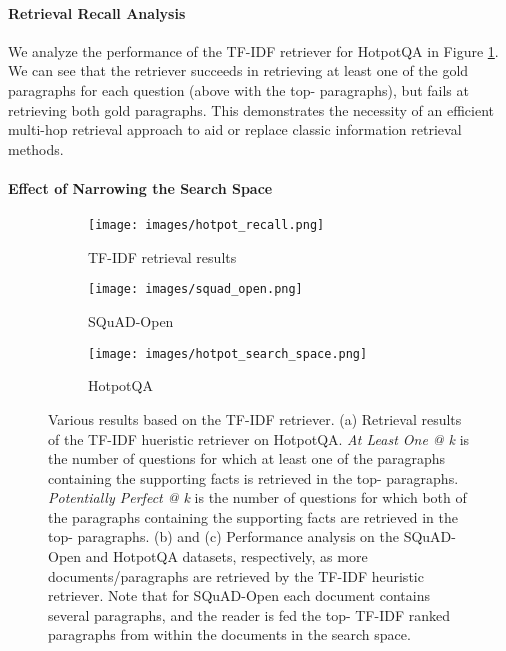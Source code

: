 \documentclass[11pt,a4paper,dvipsnames]{article}
\begin{document}
\paragraph{Retrieval Recall Analysis}



We analyze the performance of the TF-IDF retriever for HotpotQA in Figure \ref{fig:tfidf}. We can see that the retriever succeeds in retrieving at least one of the gold paragraphs for each question (above  with the top- paragraphs), but fails at retrieving both gold paragraphs. This demonstrates the necessity of an efficient multi-hop retrieval approach to aid or replace classic information retrieval methods. 


\paragraph{Effect of Narrowing the Search Space}

\begin{figure*}[!ht]
\centering
\begin{subfigure}{0.3\linewidth}
\centering
\texttt{[image: images/hotpot\_recall.png]}
\caption{TF-IDF retrieval results}
\label{fig:tfidf}
\end{subfigure}
\begin{subfigure}{0.3\linewidth}
\centering
\texttt{[image: images/squad\_open.png]}
\caption{SQuAD-Open}
\label{fig:squad_search_space}
\end{subfigure}
\begin{subfigure}{0.3\linewidth}
\centering
\texttt{[image: images/hotpot\_search\_space.png]}
\caption{HotpotQA}
\label{fig:hotpot_search_space}
\end{subfigure}
\caption{Various results based on the TF-IDF retriever. (a) Retrieval results of the TF-IDF hueristic retriever on HotpotQA. \textit{At Least One @ k} is the number of questions for which at least one of the paragraphs containing the supporting facts is retrieved in the top- paragraphs. \textit{Potentially Perfect @ k} is the number of questions for which both of the paragraphs containing the supporting facts are retrieved in the top- paragraphs.
(b) and (c)
Performance analysis on the SQuAD-Open and HotpotQA datasets, respectively, as more documents/paragraphs are retrieved by the TF-IDF heuristic retriever. Note that for SQuAD-Open each document contains several paragraphs, and the reader is fed the top- TF-IDF ranked paragraphs from within the documents in the search space.}
\label{fig:all_plots}
\end{figure*}
\end{document}
